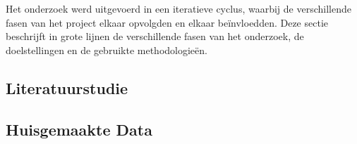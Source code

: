 
\chapter{}%
\label{ch:methodologie}


Het onderzoek werd uitgevoerd in een iteratieve cyclus, waarbij de verschillende fasen van het project elkaar opvolgden en elkaar beïnvloedden.
Deze sectie beschrijft in grote lijnen de verschillende fasen van het onderzoek, de doelstellingen en de gebruikte methodologieën.

\section{Literatuurstudie}

\section{Huisgemaakte Data}

